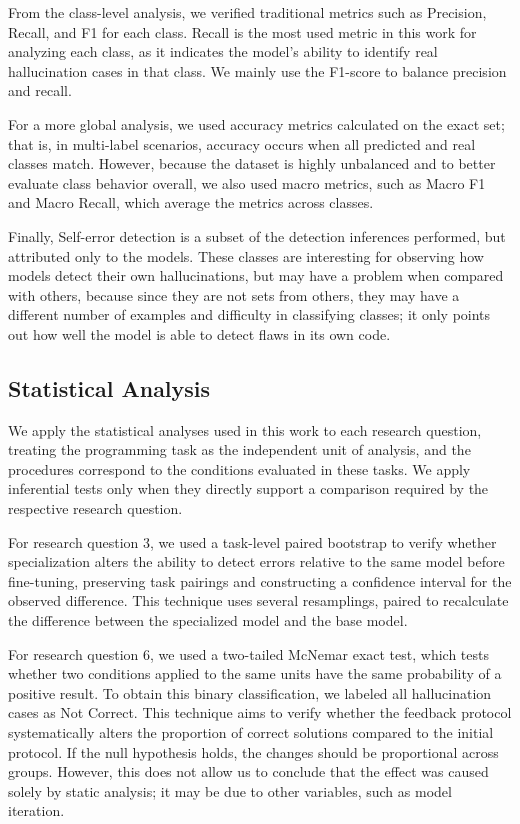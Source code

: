 From the class-level analysis, we verified traditional metrics such as Precision, Recall, and F1 for each class. Recall is the most used metric in this work for analyzing each class, as it indicates the model's ability to identify real hallucination cases in that class. We mainly use the F1-score to balance precision and recall.

For a more global analysis, we used accuracy metrics calculated on the exact set; that is, in multi-label scenarios, accuracy occurs when all predicted and real classes match. However, because the dataset is highly unbalanced and to better evaluate class behavior overall, we also used macro metrics, such as Macro F1 and Macro Recall, which average the metrics across classes.

Finally, Self-error detection is a subset of the detection inferences performed, but attributed only to the models. These classes are interesting for observing how models detect their own hallucinations, but may have a problem when compared with others, because since they are not sets from others, they may have a different number of examples and difficulty in classifying classes; it only points out how well the model is able to detect flaws in its own code.

\subsection{Statistical Analysis}
We apply the statistical analyses used in this work to each research question, treating the programming task as the independent unit of analysis, and the procedures correspond to the conditions evaluated in these tasks. We apply inferential tests only when they directly support a comparison required by the respective research question.

For research question 3, we used a task-level paired bootstrap to verify whether specialization alters the ability to detect errors relative to the same model before fine-tuning, preserving task pairings and constructing a confidence interval for the observed difference. This technique uses several resamplings, paired to recalculate the difference between the specialized model and the base model.

For research question 6, we used a two-tailed McNemar exact test, which tests whether two conditions applied to the same units have the same probability of a positive result. To obtain this binary classification, we labeled all hallucination cases as Not Correct. This technique aims to verify whether the feedback protocol systematically alters the proportion of correct solutions compared to the initial protocol. If the null hypothesis holds, the changes should be proportional across groups. However, this does not allow us to conclude that the effect was caused solely by static analysis; it may be due to other variables, such as model iteration.

